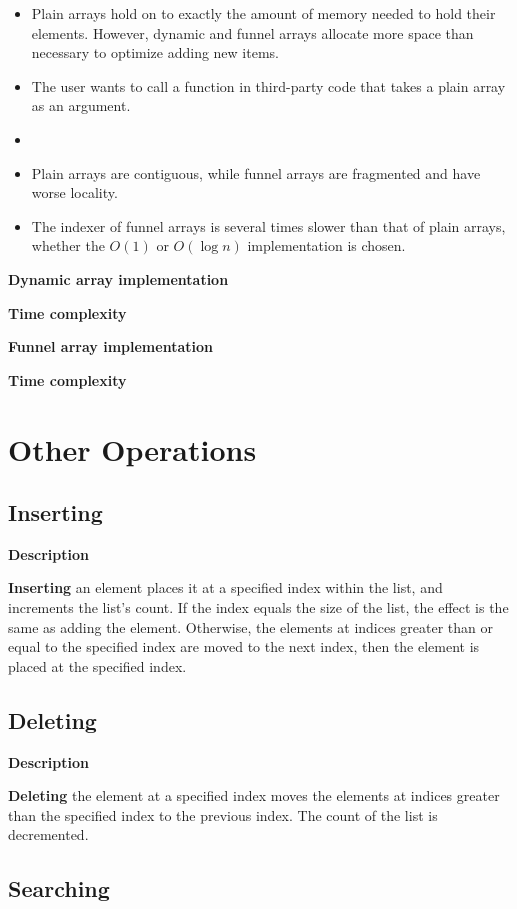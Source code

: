 \documentclass{article}
\newcommand{\descriptn}{\textbf{Description}}
\newcommand{\dynarrayimpl}{\textbf{Dynamic array implementation}}
\newcommand{\funarrayimpl}{\textbf{Funnel array implementation}}
\newcommand{\tcomplex}{\textbf{Time complexity}}
\newcommand{\bigo}{O}
\newcommand{\varnitems}{n}
\begin{document}
	\begin{itemize}
		\item Plain arrays hold on to exactly the amount of memory needed to hold their elements. However, dynamic and funnel arrays allocate more space than necessary to optimize adding new items.
		\item The user wants to call a function in third-party code that takes a plain array as an argument.
		\item
		\item Plain arrays are contiguous, while funnel arrays are fragmented and have worse locality.
		\item The indexer of funnel arrays is several times slower than that of plain arrays, whether the $\bigo(1)$ or $\bigo(\log \varnitems)$ implementation is chosen.
	\end{itemize}
	
	\dynarrayimpl
	
	\tcomplex
	
	\funarrayimpl
	
	\tcomplex
	
	\section{Other Operations}
	
	\subsection{Inserting}
	
	\descriptn
	
	\textbf{Inserting} an element places it at a specified index within the list, and increments the list's count. If the index equals the size of the list, the effect is the same as adding the element. Otherwise, the elements at indices greater than or equal to the specified index are moved to the next index, then the element is placed at the specified index.
	
	\subsection{Deleting}
	
	\descriptn
	
	\textbf{Deleting} the element at a specified index moves the elements at indices greater than the specified index to the previous index. The count of the list is decremented.
	
	\subsection{Searching}
	
\end{document}
